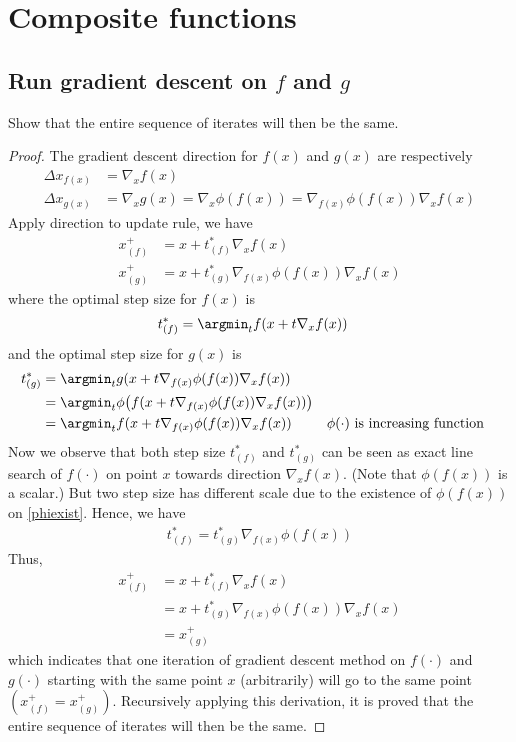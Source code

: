 \documentclass[11pt,a4paper]{article}
\begin{document}
\newpage
\section{Composite functions}
\subsection{Run gradient descent on $f$ and $g$}
Show that the entire sequence of iterates will then be the same. 
\begin{proof}
    The gradient descent direction for $f(x)$ and $g(x)$ are respectively
    \begin{align}
        \Delta x_{f(x)} &= \nabla_x f(x) \\
        \Delta x_{g(x)} &= \nabla_x g(x) 
        = \nabla_x \phi(f(x)) = \nabla_{f(x)} \phi(f(x)) \nabla_x f(x)
    \end{align}
    Apply direction to update rule, we have
    \begin{align}
        x^{+}_{(f)} &= x + t^*_{(f)} \nabla_x f(x) \\
        x^{+}_{(g)} &= x + t^*_{(g)} \nabla_{f(x)} \phi(f(x)) \nabla_x f(x)
    \end{align}
    where the optimal step size for $f(x)$ is 
    \begin{align}
        t^*_{(f)} &= \argmin_t f(x+t\nabla_x f(x))
    \end{align}
    and the optimal step size for $g(x)$ is 
    \begin{align}
        t^*_{(g)} &= \argmin_t g(x+t\nabla_{f(x)} \phi(f(x)) \nabla_x f(x)) \\
        &= \argmin_t \phi\big(f(x+t\nabla_{f(x)} \phi(f(x)) \nabla_x f(x))\big) \\
        &= \argmin_t f(x+t \nabla_{f(x)} \phi(f(x)) \nabla_x f(x))
        && \phi(\cdot) \text{ is increasing function} \label{phiexist}
    \end{align}
    Now we observe that both step size $t^*_{(f)}$ and $t^*_{(g)}$ can be seen
    as exact line search of $f(\cdot)$ on point $x$ towards direction
    $\nabla_x f(x)$. (Note that $\phi(f(x))$ is a scalar.) But two step size
    has different scale due to the existence of $\phi(f(x))$ on
    \eqref{phiexist}. Hence, we have 
    \begin{align}
        t^*_{(f)} = t^*_{(g)} \nabla_{f(x)}\phi(f(x))
    \end{align}
    Thus, 
    \begin{align}
        x^{+}_{(f)} &= x + t^*_{(f)} \nabla_x f(x) \\
        &= x +  t^*_{(g)} \nabla_{f(x)}\phi(f(x)) \nabla_x f(x) \\
        &= x^{+}_{(g)}
    \end{align}
    which indicates that one iteration of gradient descent method on
    $f(\cdot)$ and $g(\cdot)$ starting with the same point $x$ (arbitrarily)
    will go to the same point $(x^{+}_{(f)} = x^{+}_{(g)})$. Recursively
    applying this derivation, it is proved that the entire sequence of
    iterates will then be the same. 
\end{proof}
\end{document}
